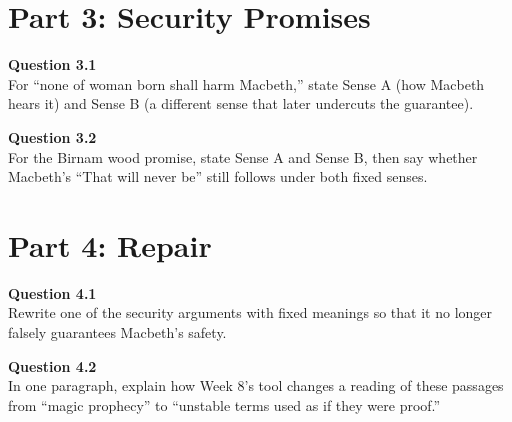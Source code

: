 \documentclass[12pt]{article}
\begin{document}
\newpage

\section*{Part 3: Security Promises}

\textbf{Question 3.1}\\[-0.15em]
For ``none of woman born shall harm Macbeth,'' state Sense A (how Macbeth hears it) and Sense B (a different sense that later undercuts the guarantee).


\textbf{Question 3.2}\\[-0.15em]
For the Birnam wood promise, state Sense A and Sense B, then say whether Macbeth's ``That will never be'' still follows under both fixed senses.


\newpage

\section*{Part 4: Repair}

\textbf{Question 4.1}\\[-0.15em]
Rewrite one of the security arguments with fixed meanings so that it no longer falsely guarantees Macbeth's safety.


\textbf{Question 4.2}\\[-0.15em]
In one paragraph, explain how Week 8's tool changes a reading of these passages from ``magic prophecy'' to ``unstable terms used as if they were proof.''

\end{document}
